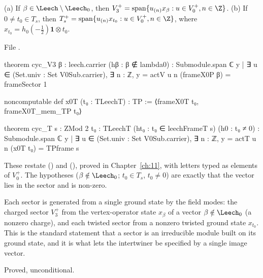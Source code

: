 \begin{theorem}\label{ch12:thm:cyc}
(a) If $\beta\in\Leech\setminus\Leech_0$, then $V_3^+=\operatorname{span}\{u_{(n)}x_\beta:u\in V_0^+,n\in\Z\}$.
(b) If $0\neq t_0\in T_s$, then $T_s^+=\operatorname{span}\{u_{(n)}x_{t_0}:u\in V_0^+,n\in\Z\}$, where
$x_{t_0}=h_0(-\tfrac12)\mathbf 1\otimes t_0$.
\end{theorem}
File .
\begin{leancode}
theorem cyc_V3 {β : leech.carrier} (hβ : β ∉ lambda0) :
    Submodule.span ℂ {y | ∃ u ∈ (Set.univ : Set V0Sub.carrier), ∃ n : ℤ, y = actV u n (frameX0P β)}
      = frameSector 1

noncomputable def x0T (t₀ : TLeechT) : TP := ⟨frameX0T t₀, frameX0T_mem_TP t₀⟩

theorem cyc_T {s : ZMod 2} {t₀ : TLeechT} (ht₀ : t₀ ∈ leechFrameT s) (h0 : t₀ ≠ 0) :
    Submodule.span ℂ {y | ∃ u ∈ (Set.univ : Set V0Sub.carrier), ∃ n : ℤ, y = actT u n (x0T t₀)}
      = TPframe s
\end{leancode}
\begin{dictionary}
These restate  () and
 (), proved in Chapter~\ref{ch:11},
with letters typed as elements of $V_0^+$.  The hypotheses ($\beta\notin\Leech_0$; $t_0\in T_s$,
$t_0\neq0$) are exactly that the vector lies in the sector and is non-zero.
\end{dictionary}

\begin{physics}
Each sector is generated from a single ground state by the field modes: the charged sector $V_3^+$ from the vertex-operator state $x_\beta$ of a vector $\beta\notin\Leech_0$ (a nonzero charge), and each twisted sector from a nonzero twisted ground state $x_{t_0}$. This is the standard statement that a sector is an irreducible module built on its ground state, and it is what lets the intertwiner be specified by a single image vector.
\end{physics}
\begin{status}Proved, unconditional.\end{status}

